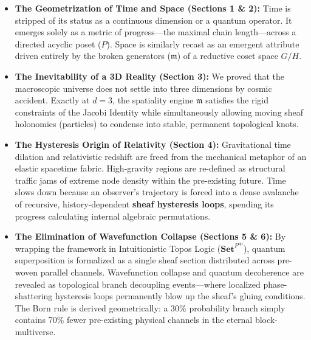 \documentclass[12pt,letterpaper]{article}
\begin{document}
\begin{itemize}
    \item \textbf{The Geometrization of Time and Space (Sections 1 \& 2):} Time is stripped of its status as a continuous dimension or a quantum operator. It emerges solely as a metric of progress---the maximal chain length---across a directed acyclic poset ($P$). Space is similarly recast as an emergent attribute driven entirely by the broken generators ($\mathfrak{m}$) of a reductive coset space $G/H$.
    \item \textbf{The Inevitability of a 3D Reality (Section 3):} We proved that the macroscopic universe does not settle into three dimensions by cosmic accident. Exactly at $d=3$, the spatiality engine $\mathfrak{m}$ satisfies the rigid constraints of the Jacobi Identity while simultaneously allowing moving sheaf holonomies (particles) to condense into stable, permanent topological knots.
    \item \textbf{The Hysteresis Origin of Relativity (Section 4):} Gravitational time dilation and relativistic redshift are freed from the mechanical metaphor of an elastic spacetime fabric. High-gravity regions are re-defined as structural traffic jams of extreme node density within the pre-existing future. Time slows down because an observer's trajectory is forced into a dense avalanche of recursive, history-dependent \textbf{sheaf hysteresis loops}, spending its progress calculating internal algebraic permutations.
    \item \textbf{The Elimination of Wavefunction Collapse (Sections 5 \& 6):} By wrapping the framework in Intuitionistic Topos Logic ($\mathbf{Set}^{P^{\text{op}}}$), quantum superposition is formalized as a single sheaf section distributed across pre-woven parallel channels. Wavefunction collapse and quantum decoherence are revealed as topological branch decoupling events---where localized phase-shattering hysteresis loops permanently blow up the sheaf's gluing conditions. The Born rule is derived geometrically: a 30\% probability branch simply contains 70\% fewer pre-existing physical channels in the eternal block-multiverse.
\end{itemize}
\end{document}
